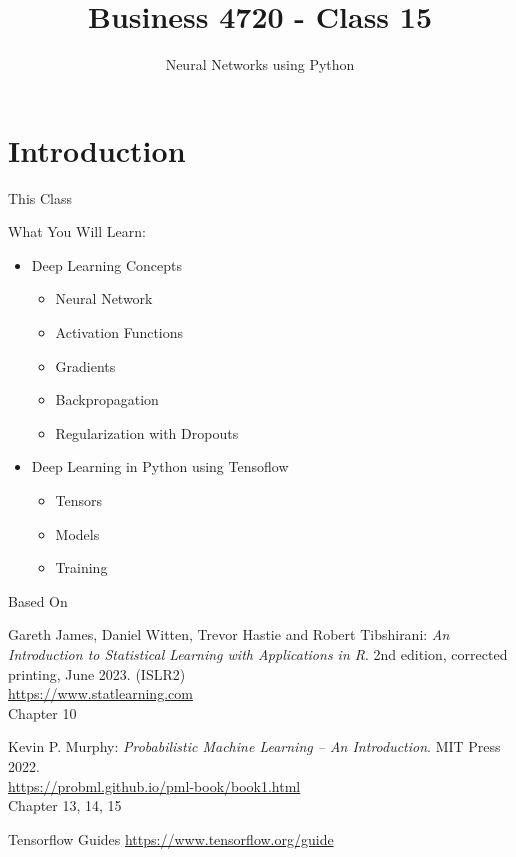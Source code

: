 \documentclass[ignorenonframetext,xcolor=x11names]{beamer}
\title{Business 4720 - Class 15}
\subtitle{Neural Networks using Python}
\begin{document}
\begin{frame}{}
  \titlepage
  \footnotesize
  
\end{frame}

\section{Introduction}

\begin{frame}{This Class}

\begin{block}{What You Will Learn:}
\begin{itemize}
  \item Deep Learning Concepts
  \begin{itemize}
     \item Neural Network
     \item Activation Functions
     \item Gradients
     \item Backpropagation
     \item Regularization with Dropouts
 \end{itemize}
 \item Deep Learning in Python using Tensoflow
 \begin{itemize}
     \item Tensors
     \item Models
     \item Training
  \end{itemize}
\end{itemize}
\end{block}
\end{frame}

\begin{frame}{Based On}
\small
\begin{block}{}
Gareth James, Daniel Witten, Trevor Hastie and Robert Tibshirani: \emph{An Introduction to Statistical Learning with Applications in R}. 2nd edition, corrected printing, June 2023. (ISLR2) \\
\vspace{1mm}
\url{https://www.statlearning.com} \\
\vspace{1mm}
Chapter 10
\end{block}

\begin{block}{}
Kevin P. Murphy: \emph{Probabilistic Machine Learning -- An Introduction}. MIT Press 2022. \\
\vspace{1mm}
\url{https://probml.github.io/pml-book/book1.html} \\
\vspace{1mm}
Chapter 13, 14, 15
\end{block}

\begin{block}{Tensorflow Guides}
\url{https://www.tensorflow.org/guide}
\end{block}
\end{frame}
\end{document}
